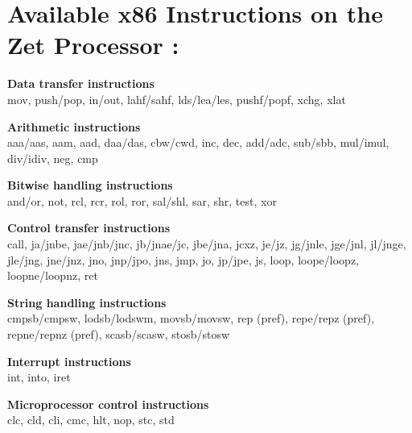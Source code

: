 \documentclass[11pt,peerreview, onecolumn]{IEEEtran}
\begin{document}
\label{App:AppendixB}
\section{Available x86 Instructions on the Zet Processor \cite{ZetStatus}:}

{\noindent\bf Data transfer instructions} \\
mov, push/pop, in/out, lahf/sahf, lds/lea/les, pushf/popf, xchg, xlat

{\noindent\bf Arithmetic instructions} \\
aaa/aas, aam, aad, daa/das, cbw/cwd, inc, dec, add/adc, sub/sbb, mul/imul, div/idiv, neg, cmp

{\noindent\bf Bitwise handling instructions} \\
and/or, not, rcl, rcr, rol, ror, sal/shl, sar, shr, test, xor

{\noindent\bf Control transfer instructions} \\
call, ja/jnbe, jae/jnb/jnc, jb/jnae/jc, jbe/jna, jcxz, je/jz, jg/jnle, jge/jnl, jl/jnge, jle/jng, jne/jnz, jno, jnp/jpo, jns, jmp, jo, jp/jpe, js, loop, loope/loopz, loopne/loopnz, ret

{\noindent\bf String handling instructions}\\
cmpsb/cmpsw, lodsb/lodswm, movsb/movsw, rep (pref), repe/repz (pref), repne/repnz (pref), scasb/scasw, stosb/stosw

{\noindent\bf Interrupt instructions} \\
int, into, iret

{\noindent\bf Microprocessor control instructions} \\
clc, cld, cli, cmc, hlt, nop, stc, std



\end{document}

